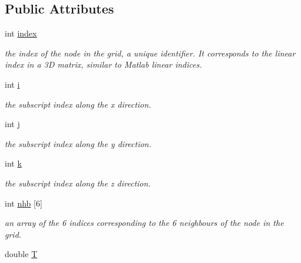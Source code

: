 \subsection*{Public Attributes}
\begin{DoxyCompactItemize}
\item 
\hypertarget{class_node_ac8055cdbda20cacce417192557741ab8}{}int \hyperlink{class_node_ac8055cdbda20cacce417192557741ab8}{index}\label{class_node_ac8055cdbda20cacce417192557741ab8}

\begin{DoxyCompactList}\small\item\em the index of the node in the grid, a unique identifier. It corresponds to the linear index in a 3\+D matrix, similar to Matlab linear indices. \end{DoxyCompactList}\item 
\hypertarget{class_node_ac92c571228f56330b3e37ca1d43feb93}{}int \hyperlink{class_node_ac92c571228f56330b3e37ca1d43feb93}{i}\label{class_node_ac92c571228f56330b3e37ca1d43feb93}

\begin{DoxyCompactList}\small\item\em the subscript index along the x direction. \end{DoxyCompactList}\item 
\hypertarget{class_node_a747e7d35178b7a2c4020b9ca4d26ea89}{}int \hyperlink{class_node_a747e7d35178b7a2c4020b9ca4d26ea89}{j}\label{class_node_a747e7d35178b7a2c4020b9ca4d26ea89}

\begin{DoxyCompactList}\small\item\em the subscript index along the y direction. \end{DoxyCompactList}\item 
\hypertarget{class_node_a0606a25fcca0b0ebfff00711c8b6db03}{}int \hyperlink{class_node_a0606a25fcca0b0ebfff00711c8b6db03}{k}\label{class_node_a0606a25fcca0b0ebfff00711c8b6db03}

\begin{DoxyCompactList}\small\item\em the subscript index along the z direction. \end{DoxyCompactList}\item 
int \hyperlink{class_node_a8c9884342c7159797193a004efc41487}{nhb} \mbox{[}6\mbox{]}
\begin{DoxyCompactList}\small\item\em an array of the 6 indices corresponding to the 6 neighbours of the node in the grid. \end{DoxyCompactList}\item 
\hypertarget{class_node_af2767a71fa91a4331c145bf9f002e48a}{}double \hyperlink{class_node_af2767a71fa91a4331c145bf9f002e48a}{T}\label{class_node_af2767a71fa91a4331c145bf9f002e48a}


\end{DoxyCompactItemize}
